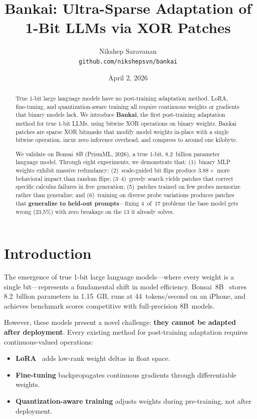 \documentclass[11pt,a4paper]{article}
\title{Bankai: Ultra-Sparse Adaptation of 1-Bit LLMs via XOR Patches}
\author{
  Nikshep Saravanan \\
  \texttt{github.com/nikshepsvn/bankai}
}
\date{April 2, 2026}
\begin{document}
\maketitle

\begin{abstract}
True 1-bit large language models have no post-training adaptation method.
LoRA, fine-tuning, and quantization-aware training all require continuous
weights or gradients that binary models lack. We introduce \textbf{Bankai},
the first post-training adaptation method for true 1-bit LLMs, using
bitwise XOR operations on binary weights. Bankai patches are sparse XOR
bitmasks that modify model weights in-place with a single bitwise operation,
incur zero inference overhead, and compress to around one kilobyte.

We validate on Bonsai~8B (PrismML, 2026), a true 1-bit, 8.2~billion
parameter language model. Through eight experiments, we demonstrate that:
(1)~binary MLP weights exhibit massive redundancy;
(2)~scale-guided bit flips produce $3.88\times$ more behavioral impact
than random flips;
(3--4)~greedy search yields patches that correct specific calculus failures
in free generation;
(5)~patches trained on few probes memorize rather than generalize; and
(6)~training on diverse probe variations produces patches that
\textbf{generalize to held-out prompts}---fixing 4~of~17 problems
the base model gets wrong (23.5\%) with zero breakage on the 13 it
already solves.
\end{abstract}

\section{Introduction}

The emergence of true 1-bit large language models---where every weight is
a single bit---represents a fundamental shift in model efficiency.
Bonsai~8B~\citep{prismml2026} stores 8.2~billion parameters in 1.15~GB,
runs at 44~tokens/second on an iPhone, and achieves benchmark scores
competitive with full-precision 8B~models.

However, these models present a novel challenge: \textbf{they cannot be
adapted after deployment}. Every existing method for post-training
adaptation requires continuous-valued operations:

\begin{itemize}[nosep]
  \item \textbf{LoRA}~\citep{hu2021lora} adds low-rank weight deltas in
    float space.
  \item \textbf{Fine-tuning} backpropagates continuous gradients through
    differentiable weights.
  \item \textbf{Quantization-aware training} adjusts weights during
    pre-training, not after deployment.
\end{itemize}
\end{document}
